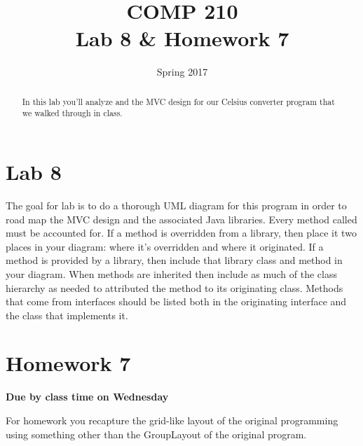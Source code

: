 \documentclass[]{tufte-handout}
\title{COMP 210 \\ Lab 8 \& Homework 7}
\date{Spring 2017}
\begin{document}
\maketitle

\begin{abstract}
In this lab you'll analyze and the MVC design for our Celsius converter program that we walked through in class.
\end{abstract}

\section{Lab 8}

The goal for lab is to do a thorough UML diagram for this program in order to road map the MVC design and the associated Java libraries. Every method called must be accounted for. If a method is overridden from a library, then place it two places in your diagram: where it's overridden and where it originated. If a method is provided by a library, then include that library class and method in your diagram. When methods are inherited then include as much of the class hierarchy as needed to attributed the method to its originating class. Methods that come from interfaces should be listed both in the originating interface and the class that implements it.

\section{Homework 7}

\begin{center}
\textbf{Due by class time on Wednesday}
\end{center}

For homework you recapture the grid-like layout of the original programming using something other than the GroupLayout of the original program.
\end{document}
